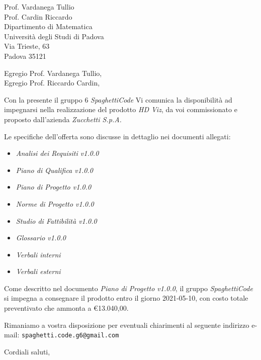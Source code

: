 \documentclass[a4paper,12pt]{letteracdp}
\date{11 gennaio 2021}
\begin{document}
\begin{letter}{
		\vspace*{-2\baselineskip}
		Prof. Vardanega Tullio \\
		Prof. Cardin Riccardo \\
		Dipartimento di Matematica \\
		Università degli Studi di Padova \\
		Via Trieste, 63 \\
		Padova 35121}

	\opening{Egregio Prof. Vardanega Tullio, \\
		\noindent Egregio Prof. Riccardo Cardin,}

	\begin{flushleft}
		Con la presente il gruppo 6 \textit{SpaghettiCode} Vi comunica la disponibilità ad impegnarsi nella realizzazione del prodotto \textit{HD Viz}, da voi commissionato e proposto dall'azienda \textit{Zucchetti S.p.A.}

		Le specifiche dell'offerta sono discusse in dettaglio nei documenti allegati:
	\end{flushleft}

	\begin{itemize}
		\item \emph{Analisi dei Requisiti v1.0.0}
		\item \emph{Piano di Qualifica v1.0.0}
		\item \emph{Piano di Progetto v1.0.0}
		\item \emph{Norme di Progetto v1.0.0}
		\item \emph{Studio di Fattibilità v1.0.0}
		\item \emph{Glossario v1.0.0}
		\item \emph{Verbali interni}
		\item \emph{Verbali esterni}
	\end{itemize}

	\begin{flushleft}
		Come descritto nel documento \emph{Piano di Progetto v1.0.0}, il gruppo \textit{SpaghettiCode} si impegna a consegnare il prodotto entro il giorno 2021-05-10, con costo totale preventivato che ammonta a \euro{13.040,00}.

		Rimaniamo a vostra disposizione per eventuali chiarimenti al seguente indirizzo e-mail: {\texttt{spaghetti.code.g6@gmail.com}}
	\end{flushleft}

	\closing{Cordiali saluti,}

\end{letter}
\end{document}

